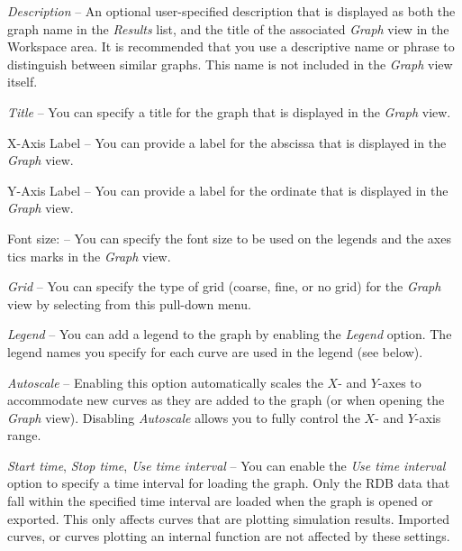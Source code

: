 \begin{bulletlist}
\item{\sl Description} --
  An optional user-specified description that is displayed as both the graph
  name in the {\sl Results} list, and the title of the associated {\sl Graph}
  view in the Workspace area. It is recommended that you use a descriptive name
  or phrase to distinguish between similar graphs.
  This name is not included in the {\sl Graph} view itself.

\item{\sl Title} --
  You can specify a title for the graph
  that is displayed in the {\sl Graph} view.

\item{X-Axis Label} --
  You can provide a label for the abscissa
  that is displayed in the {\sl Graph} view.

\item{Y-Axis Label} --
  You can provide a label for the ordinate
  that is displayed in the {\sl Graph} view.

\item{Font size:} --
  You can specify the font size to be used on the legends and
  the axes tics marks in the {\sl Graph} view.

\item{\sl Grid} --
  You can specify the type of grid (coarse, fine, or no grid)
  for the {\sl Graph} view by selecting from this pull-down menu.

\item{\sl Legend} --
  You can add a legend to the graph by enabling the {\sl Legend} option.
  The legend names you specify for each curve are used in the legend
  (see  below).

\item{\sl Autoscale} --
  Enabling this option automatically scales the $X$- and $Y$-axes to accommodate
  new curves as they are added to the graph (or when opening the {\sl Graph}
  view). Disabling {\sl Autoscale} allows you to fully control the $X$- and
  $Y$-axis range.

\item{\sl Start time}, {\sl Stop time}, {\sl Use time interval} --
  You can enable the {\sl Use time interval} option to specify a time interval
  for loading the graph. Only the RDB data that fall within the specified time
  interval are loaded when the graph is opened or exported.
  This only affects curves that are plotting simulation results.
  Imported curves, or curves plotting an internal function are not affected by
  these settings.
\end{bulletlist}

